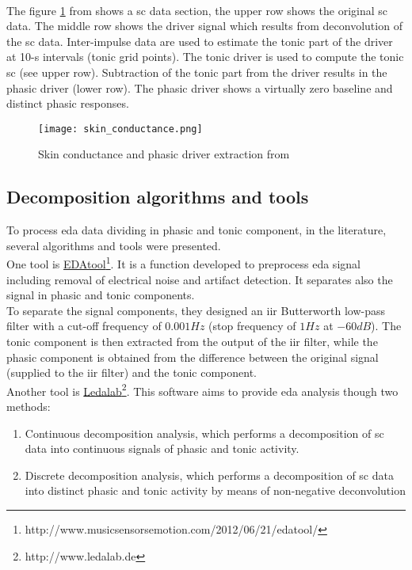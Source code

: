 \\
The figure \ref{fig:skin_conductance} from \cite{benedek2010continuous} shows a \gls{sc} data section, the upper row shows the original \gls{sc} data. The middle row shows the driver signal which results from deconvolution of the \gls{sc} data. Inter-impulse data are used to estimate the tonic part of the driver at 10-s intervals (tonic grid points). The tonic driver is used to compute the tonic \gls{sc} (see upper row). Subtraction of the tonic part from the driver results in the phasic driver (lower row). The phasic driver shows a virtually zero baseline and distinct phasic responses. 
\begin{figure}[h]
    \centering
    \texttt{[image: skin\_conductance.png]} 
	\caption{Skin conductance and phasic driver extraction from \cite{benedek2010continuous}}
    \label{fig:skin_conductance}
\end{figure}

\subsection{Decomposition algorithms and tools}
To process \gls{eda} data dividing in phasic and tonic component, in the literature, several algorithms and tools were presented.
\\ \indent
One tool is \href{http://www.musicsensorsemotion.com/2012/06/21/edatool/}{EDAtool}\footnote{http://www.musicsensorsemotion.com/2012/06/21/edatool/}. It is a function developed to preprocess \gls{eda} signal including removal of electrical noise and artifact detection. It separates also the signal in phasic and tonic components.
\\
To separate the signal components, they designed an \gls{iir} Butterworth low-pass filter with a cut-off frequency of $0.001Hz$ (stop frequency of $1Hz$ at $-60dB$). The tonic component is then extracted from the output of the \gls{iir} filter, while the phasic component is obtained from the difference between the original signal (supplied to the \gls{iir} filter) and the tonic component.
\\ \indent
Another tool is \href{http://www.ledalab.de}{Ledalab}\footnote{http://www.ledalab.de}. This software aims to provide \gls{eda} analysis though two methods:
\begin{enumerate}
	\item  Continuous decomposition analysis, which performs a decomposition of \gls{sc} data into continuous signals of phasic and tonic activity.
	\item Discrete decomposition analysis, which performs a decomposition of \gls{sc} data into distinct phasic and tonic activity by means of non-negative deconvolution
\end{enumerate}

